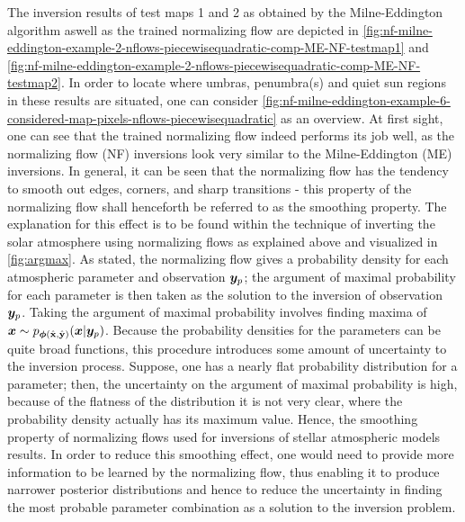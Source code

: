 \documentclass[a4paper,12pt]{report}
\begin{document}
The inversion results of test maps 1 and 2 as obtained by the Milne-Eddington algorithm aswell as the trained normalizing flow are depicted in \cref{fig:nf-milne-eddington-example-2-nflows-piecewisequadratic-comp-ME-NF-testmap1} and \cref{fig:nf-milne-eddington-example-2-nflows-piecewisequadratic-comp-ME-NF-testmap2}. In order to locate where umbras, penumbra(s) and quiet sun regions in these results are situated, one can consider \cref{fig:nf-milne-eddington-example-6-considered-map-pixels-nflows-piecewisequadratic} as an overview. At first sight, one can see that the trained normalizing flow indeed performs its job well, as the normalizing flow (NF) inversions look very similar to the Milne-Eddington (ME) inversions. In general, it can be seen that the normalizing flow has the tendency to smooth out edges, corners, and sharp transitions - this property of the normalizing flow shall henceforth be referred to as the smoothing property. The explanation for this effect is to be found within the technique of inverting the solar atmosphere using normalizing flows as explained above and visualized in \cref{fig:argmax}. As stated, the normalizing flow gives a probability density for each atmospheric parameter and observation $\bm{y}_p$; the argument of maximal probability for each parameter is then taken as the solution to the inversion of observation $\bm{y}_p$. Taking the argument of maximal probability involves finding maxima of $\bm{x} \sim p_{\bm{\phi}(\hat{\boldsymbol{\mathbf{x}}},\hat{\boldsymbol{\mathbf{y}}})}(\bm{x}|\bm{y}_p)$. Because the probability densities for the parameters can be quite broad functions, this procedure introduces some amount of uncertainty to the inversion process. Suppose, one has a nearly flat probability distribution for a parameter; then, the uncertainty on the argument of maximal probability is high, because of the flatness of the distribution it is not very clear, where the probability density actually has its maximum value. Hence, the smoothing property of normalizing flows used for inversions of stellar atmospheric models results. In order to reduce this smoothing effect, one would need to provide more information to be learned by the normalizing flow, thus enabling it to produce narrower posterior distributions and hence to reduce the uncertainty in finding the most probable parameter combination as a solution to the inversion problem.
\end{document}
